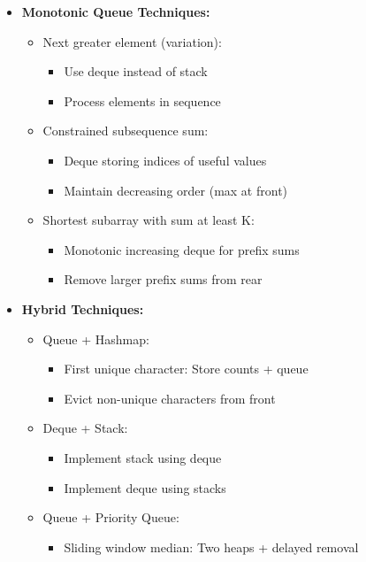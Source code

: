 \documentclass[a4paper,10pt]{book}
\begin{document}
\begin{itemize}
    \item \textbf{Monotonic Queue Techniques:}
    \begin{itemize}
        \item Next greater element (variation):
        \begin{itemize}
            \item Use deque instead of stack
            \item Process elements in sequence
        \end{itemize}
        \item Constrained subsequence sum:
        \begin{itemize}
            \item Deque storing indices of useful values
            \item Maintain decreasing order (max at front)
        \end{itemize}
        \item Shortest subarray with sum at least K:
        \begin{itemize}
            \item Monotonic increasing deque for prefix sums
            \item Remove larger prefix sums from rear
        \end{itemize}
    \end{itemize}
    
    \item \textbf{Hybrid Techniques:}
    \begin{itemize}
        \item Queue + Hashmap:
        \begin{itemize}
            \item First unique character: Store counts + queue
            \item Evict non-unique characters from front
        \end{itemize}
        \item Deque + Stack:
        \begin{itemize}
            \item Implement stack using deque
            \item Implement deque using stacks
        \end{itemize}
        \item Queue + Priority Queue:
        \begin{itemize}
            \item Sliding window median: Two heaps + delayed removal
        \end{itemize}
    \end{itemize}
    

\end{itemize}
\end{document}
